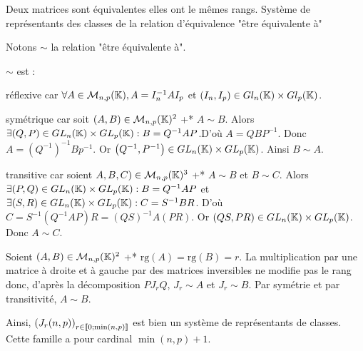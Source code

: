 \documentclass{article}
\begin{document}
\begin{question_kholle}[{
	Soient $(A, B) \in \mathcal{M}_{n, p}(\mathbb{K})^2$. $A$ est équivalente à $B$ s'il existe $(P, Q) \in GL_n(\K) \times GL_p(\K)$ \tq* $B = Q^{-1} A P$.
	
	Montrons que deux matrices sont équivalentes \ssi elles ont le mêmes rangs, que "être équivalente à" est une relation d'équivalence, qu'il y a $\min(n, p) + 1$ classes et que $\left(J_r(n, p)\right)_{r \in \lient 0; \min(n, p) \rient}$ est un système de représentants de classes.
	}]
	{Deux matrices sont équivalentes \ssi elles ont le mêmes rangs. Système de représentants des classes de la relation d'équivalence "être équivalente à"}
	
	Notons $\sim$ la relation "être équivalente à".
	
	$\sim$ est :
	\begin{liste}
		\item réflexive car $\forall A \in \mathcal{M}_{n, p}(\mathbb K), A = I_n^{-1} A I_p$ et $(I_n, I_p) \in Gl_n(\mathbb K) \times Gl_p(\mathbb K)$.
		\item symétrique car soit $(A, B) \in \mathcal{M}_{n, p}(\mathbb K)^2$ \tq+* $A \sim B$.
		Alors $\exists (Q, P) \in GL_n(\mathbb K) \times GL_p(\mathbb K) : B = Q^{-1} A P$.D'où $A = Q B P^{-1}$.
		Donc $A = \left(Q^{-1}\right)^{-1} B p^{-1}$.
		Or $\left(Q^{-1}, P^{-1}\right) \in GL_n(\mathbb K) \times GL_p(\mathbb K)$. Ainsi $B \sim A$.
		\item transitive car soient $A, B, C) \in \mathcal{M}_{n, p}(\mathbb K)^3$ \tq+* $A \sim B$ et $B \sim C$.
		Alors $\exists (P, Q) \in GL_n(\mathbb K) \times GL_p(\mathbb K) : B = Q^{-1} A P$ et $\exists (S, R) \in GL_n(\mathbb K) \times GL_p(\mathbb K) : C = S^{-1} B R$.
		D'où $C = S^{-1} \left(Q^{-1} A P\right) R = (QS)^{-1} A (PR)$.
		Or $(QS, PR) \in GL_n(\mathbb K) \times GL_p(\mathbb K)$.
		Donc $A \sim C$.
	\end{liste}
	
	Soient $(A, B) \in \mathcal{M}_{n, p}(\mathbb K)^2$ \tq+* $\mathrm{rg}(A) = \mathrm{rg}(B) = r$.
	La multiplication par une matrice à droite et à gauche par des matrices inversibles ne modifie pas le rang donc, d'après la décomposition $P J_r Q$, $J_r \sim A$ et $J_r \sim B$.
	Par symétrie et par transitivité, $A \sim B$.
	
	Ainsi, $\left(J_r(n, p)\right)_{r \in \lient 0; \min(n, p) \rient}$ est bien un système de représentants de classes.
	Cette famille a pour cardinal $\min(n, p) + 1$.
\end{question_kholle}
\end{document}
